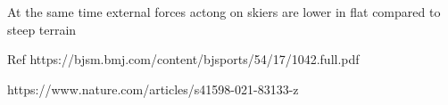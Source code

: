 At the same time external forces actong on skiers are lower in flat compared to steep terrain 

Ref
https://bjsm.bmj.com/content/bjsports/54/17/1042.full.pdf

https://www.nature.com/articles/s41598-021-83133-z


